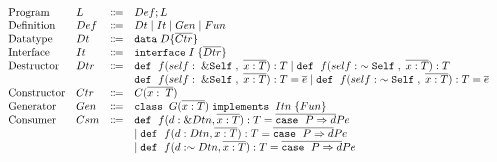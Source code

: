 \documentclass[ oneside,%
                    author={James Elgar},
                    degree={MEng},
                     title={Bidirectional transformer between functional and \\ object-oriented programming in Rust},
                  subtitle={}]{dissertation}
\begin{document}
\begin{figure}[t]
  \begin{displaymath}
    \begin{array}{l}
      \begin{array}{llcl}
        \text{Program}
        & L & \Coloneqq & Def ; L\\
        \text{Definition}
        & Def & \Coloneqq & Dt \mid It \mid Gen \mid Fun \\
        \text{Datatype}
         & Dt & \Coloneqq & \texttt{data} \; D \{ {\overline{{Ctr}}} \}\\
        \text{Interface}
         & It & \Coloneqq & \texttt{interface} \; I \; \{ {\overline{{Dtr}}} \}\\
        \text{Destructor}
         & Dtr & \Coloneqq & \texttt{def} \; \ f(self:\; \&\texttt{Self} \;, \;\overline{x: T}): T \mid \texttt{def} \; \ f(self:\; \sim \texttt{Self} \;, \;\overline{x: T}): T\\
         &     &           &  \texttt{def} \; \ f(self:\; \&\texttt{Self} \;, \;\overline{x: T}): T = \overline{e} \mid \texttt{def} \; \ f(self:\; \sim \texttt{Self} \;, \;\overline{x: T}): T = \overline{e} \\
        \text{Constructor}
        & Ctr & \Coloneqq & C(\overline{x:\; T}) \; \\
        \text{Generator}
         & Gen & \Coloneqq & \texttt{class} \; \; {G} (\overline{{x} : {T}}) \; \texttt{implements} \; \; {Itn} \; \{ {{Fun}} \}\\
         
        \text{Consumer}
        & Csm & \Coloneqq & \texttt{def} \; \ f(d: \&Dtn, \overline{x: T}): T = \overline{\texttt{case} \;\ {P} \Rightarrow {d}} {P} {e} \\
        &     &           & \mid \texttt{def} \; \ f(d: Dtn, \overline{x: T}): T = \overline{\texttt{case} \;\ {P} \Rightarrow {d}} {P} {e}\\
        &     &           & \mid \texttt{def} \; \ f(d: \sim Dtn, \overline{x: T}): T = \overline{\texttt{case} \;\ {P} \Rightarrow {d}} {P} {e}\\
        

\end{array}
\end{array}
\end{displaymath}
\end{figure}
\end{document}
